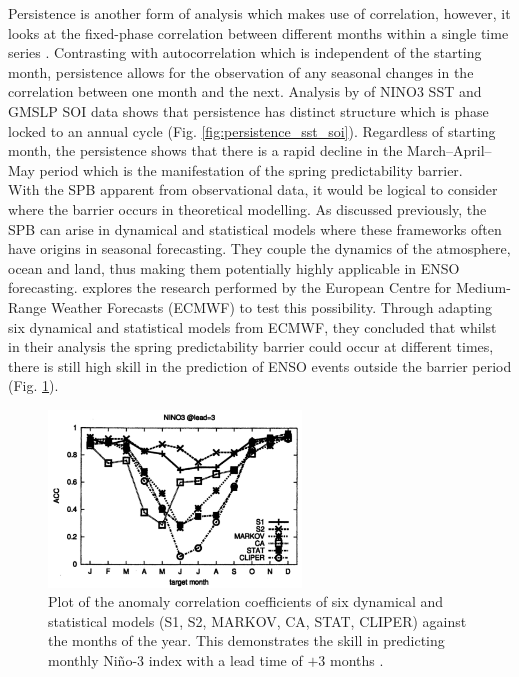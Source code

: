 \documentclass[12pt, onecolumn]{revtex4}    %
\begin{document}
Persistence is another form of analysis which makes use of correlation, however, it looks at the fixed-phase correlation between different months within a single time series \citep{troup1965southern}. Contrasting with autocorrelation which is independent of the starting month, persistence allows for the observation of any seasonal changes in the correlation between one month and the next. Analysis by \cite{torrence1998annual} of NINO3 SST and GMSLP SOI data shows that persistence has distinct structure which is phase locked to an annual cycle (Fig. \ref{fig:persistence_sst_soi}). Regardless of starting month, the persistence shows that there is a rapid decline in the March--April--May period which is the manifestation of the spring predictability barrier. \\

With the SPB apparent from observational data, it would be logical to consider where the barrier occurs in theoretical modelling. As discussed previously, the SPB can arise in dynamical and statistical models where these frameworks often have origins in seasonal forecasting. They couple the dynamics of the atmosphere, ocean and land, thus making them potentially highly applicable in ENSO forecasting. \cite{jan2005did} explores the research performed by the European Centre for Medium-Range Weather Forecasts (ECMWF) to test this possibility. Through adapting six dynamical and statistical models from ECMWF, they concluded that whilst in their analysis the spring predictability barrier could occur at different times, there is still high skill in the prediction of ENSO events outside the barrier period (Fig. \ref{fig:ecmwf_plot}). \\

\begin{figure}
\includegraphics[width=0.6\textwidth]{data/ecmwf_data}
\caption[Persistence]{Plot of the anomaly correlation coefficients of six dynamical and statistical models (S1, S2, MARKOV, CA, STAT, CLIPER) against the months of the year. This demonstrates the skill in predicting monthly Ni\~{n}o-3 index with a lead time of $+3$ months \citep{jan2005did}.}
\label{fig:ecmwf_plot}
\end{figure}
\end{document}
